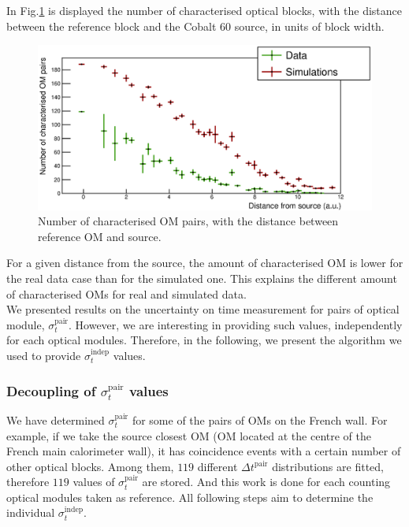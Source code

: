 In Fig.\ref{fig:Co_sigma_distance} is displayed the number of characterised optical blocks, with the distance between the reference block and the Cobalt $60$ source, in units of block width.
\begin{figure}[h]
  \centering
  \includegraphics[width=15cm]{commissioning/fig_commissioning/Co_sigma_distance.eps}
  \caption{Number of characterised OM pairs, with the distance between reference OM and source.
    \label{fig:Co_sigma_distance}}
\end{figure}
For a given distance from the source, the amount of characterised OM is lower for the real data case than for the simulated one.
This explains the different amount of characterised OMs for real and simulated data.\\

We presented results on the uncertainty on time measurement for pairs of optical module, $\sigma_{t}^{\text{pair}}$.
However, we are interesting in providing such values, independently for each optical modules.
Therefore, in the following, we present the algorithm we used to provide $\sigma_{t}^{\text{indep}}$ values.




\subsubsection*{Decoupling of $\sigma_{t}^{\text{pair}}$ values}

We have determined $\sigma_{t}^{\text{pair}}$ for some of the pairs of OMs on the French wall.
For example, if we take the source closest OM (OM located at the centre of the French main calorimeter wall), it has coincidence events with a certain number of other optical blocks.
Among them, $119$ different $\Delta t^{\text{pair}}$ distributions are fitted, therefore $119$ values of $\sigma_{t}^{\text{pair}}$ are stored.
And this work is done for each counting optical modules taken as reference.
All following steps aim to determine the individual $\sigma_{t}^{\text{indep}}$.

